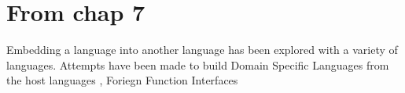 \documentclass[thesis-solanki.tex]{subfiles}
\begin{document}
\begin{comment}
\section{Possibly Related Content}
\begin{enumerate}

\item Unifying Theories of Programming, C.A.R. Hoare,
\\* \url{http://www.unifyingtheories.org/}

\item Unifying Theories of Programming with Monads, Jeremy Gibbons,
\\* \url{http://www.cs.ox.ac.uk/people/jeremy.gibbons/publications/utp-monads.pdf}

\end{enumerate}
\end{comment}

\begin{comment}
\begin{description}
\item[$\bullet$]Concatenative Programming Libraries
\begin{enumerate}
	\item peg \cite{peg-lib}
\end{enumerate}

\item[$\bullet$]Constraint Programming and Constraint Handling Rules
\begin{enumerate}
	\item monadiccp \cite{monadiccp-lib}
	\item monadicccp-gecode \cite{monadiccp-gecode-lib}
	\item csp \cite{csp-lib}
	\item liquid fix point \cite{liquid-fix-point-lib}
\end{enumerate}
\end{description}
\end{comment}


\section{\textbf{From chap 7}}

Embedding a language into another language has been explored with a variety of languages. Attempts have been made to build Domain Specific Languages from the host languages \cite{hudak1996building}, Foriegn Function Interfaces \cite{barzilay2004foreign} 
\end{document}
